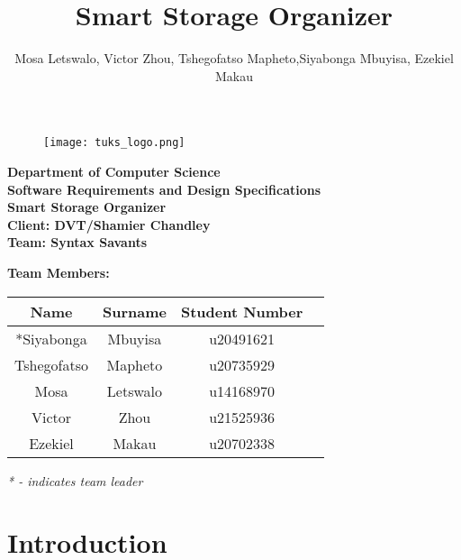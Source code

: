 \documentclass[hidelinks, 12pt, a4paper]{article}
\title{Smart Storage Organizer}
\author{Mosa Letswalo, Victor Zhou, Tshegofatso Mapheto,Siyabonga Mbuyisa, Ezekiel Makau }
\begin{document}
\begin{titlepage}
\begin{figure}
    \centering\texttt{[image: tuks\_logo.png]}
\end{figure}
\vspace{5mm}

\begin{Large}
 \begin{center}
	\textbf{Department of Computer Science}\\
	\vspace{8mm}
    \textbf{Software Requirements and Design Specifications}\\
	\vspace{8mm}
	{\huge{\bf Smart Storage Organizer}}\\
	\textbf{Client: DVT/Shamier Chandley}\\
	\vspace{8mm}
	{\huge{\bf Team: Syntax Savants}}

	\textbf{Team Members: }

    \begin{table}[h]
        \centering
        \begin{tabular}{|c|c|c|c|}

            \hline
            Name        &     Surname   &   Student Number  \\ \hline
            *Siyabonga     &     Mbuyisa     &  u20491621  \\ \hline
            Tshegofatso      &    Mapheto   &  u20735929        \\ \hline
            Mosa        &   Letswalo    &   u14168970      \\ \hline
            Victor     &    Zhou       &   u21525936       \\\hline
            Ezekiel    &   Makau   &   u20702338       \\ \hline
        \end{tabular}
    \end{table}
    \textit{* - indicates team leader}
\end{center}
\end{Large}
\end{titlepage}

\setcounter{tocdepth}{4}
\setcounter{secnumdepth}{4}
\tableofcontents
\newpage

\section{Introduction}
\end{document}
